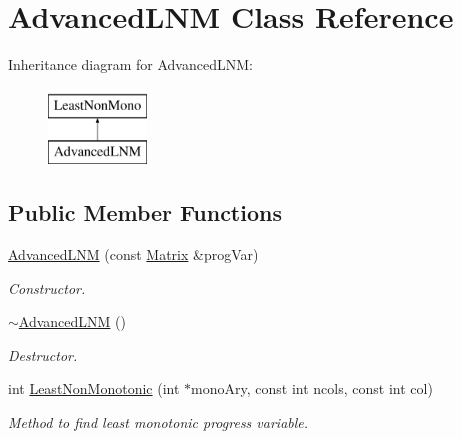 \hypertarget{classAdvancedLNM}{
\section{AdvancedLNM Class Reference}
\label{dd/d1d/classAdvancedLNM}
}
Inheritance diagram for AdvancedLNM:\begin{figure}[H]
\begin{center}
\leavevmode
\includegraphics[height=2cm]{dd/d1d/classAdvancedLNM}
\end{center}
\end{figure}
\subsection*{Public Member Functions}
\begin{DoxyCompactItemize}
\item 
\hyperlink{classAdvancedLNM_af9317f34be7610889b8d37c606165ec4}{AdvancedLNM} (const \hyperlink{classMatrix}{Matrix} \&progVar)
\begin{DoxyCompactList}\small\item\em Constructor. \item\end{DoxyCompactList}\item 
\hypertarget{classAdvancedLNM_af44785dd7ff58621804d9911be88836a}{
\hyperlink{classAdvancedLNM_af44785dd7ff58621804d9911be88836a}{$\sim$AdvancedLNM} ()}
\label{dd/d1d/classAdvancedLNM_af44785dd7ff58621804d9911be88836a}

\begin{DoxyCompactList}\small\item\em Destructor. \item\end{DoxyCompactList}\item 
int \hyperlink{classAdvancedLNM_aaf028bdf53b6428371d122eb4cf343b4}{LeastNonMonotonic} (int $\ast$monoAry, const int ncols, const int col)
\begin{DoxyCompactList}\small\item\em Method to find least monotonic progress variable. \item\end{DoxyCompactList}\end{DoxyCompactItemize}



